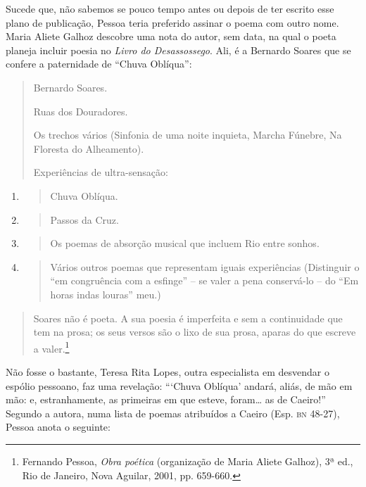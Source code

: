 Sucede que, não sabemos se pouco tempo antes ou depois de ter escrito
esse plano de publicação, Pessoa teria preferido assinar o poema com
outro nome. Maria Aliete Galhoz descobre uma nota do autor, sem data, na
qual o poeta planeja incluir poesia no \emph{Livro do Desassossego}.
Ali, é a Bernardo Soares que se confere a paternidade de ``Chuva
Oblíqua'':

\begin{quote}
\forceindent Bernardo Soares.

Ruas dos Douradores.

Os trechos vários (Sinfonia de uma noite inquieta, Marcha Fúnebre, Na
Floresta do Alheamento).

Experiências de ultra-sensação:
\end{quote}

\begin{enumerate}
\def\labelenumi{\arabic{enumi}.}
\item
  \begin{quote}
  Chuva Oblíqua.
  \end{quote}
\item
  \begin{quote}
  Passos da Cruz.
  \end{quote}
\item
  \begin{quote}
  Os poemas de absorção musical que incluem Rio entre sonhos.
  \end{quote}
\item
  \begin{quote}
  Vários outros poemas que representam iguais experiências (Distinguir o
  ``em congruência com a esfinge'' -- se valer a pena conservá-lo -- do
  ``Em horas indas louras'' meu.)
  \end{quote}
\end{enumerate}
\vspace{-12pt}
\begin{quote}
Soares não é poeta. A sua poesia é imperfeita e sem a continuidade que
tem na prosa; os seus versos são o lixo de sua prosa, aparas do que
escreve a valer.\footnote{Fernando Pessoa, \emph{Obra poética}
  (organização de Maria Aliete Galhoz), 3ª ed., Rio de Janeiro, Nova
  Aguilar, 2001, pp. 659-660.}
\end{quote}

Não fosse o bastante, Teresa Rita Lopes, outra especialista em desvendar
o espólio pessoano, faz uma revelação: ```Chuva Oblíqua' andará, aliás,
de mão em mão: e, estranhamente, as primeiras em que esteve, foram\ldots{} as
de Caeiro!'' Segundo a autora, numa lista de poemas atribuídos a Caeiro
(Esp. \textsc{bn} 48-27), Pessoa anota o seguinte:

